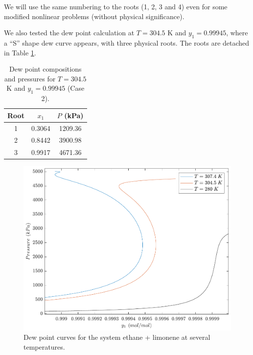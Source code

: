 \documentclass[journal=iecred,manuscript=article]{achemso}
\theoremstyle{definition}
\theoremstyle{remark}
\begin{document}
We will use the same numbering to the roots (1, 2, 3 and 4) even for some modified nonlinear problems (without physical significance).

We also tested the dew point calculation at $T = 304.5$ K and $y_1 = 0.99945$, where a ``S'' shape dew curve appears, with three physical roots. The roots are detached in Table \ref{tab:roots_S}.

\begin{table}[http!]
	\begin{center}
	\begin{tabular}{ccc} \hline \small
Root & $x_1$ & $P$ (kPa) \\
\hline
1 & 0.3064 & 1209.36 \\
2 & 0.8442 & 3900.98 \\
3 & 0.9917 & 4671.36 \\
	\hline
	\end{tabular}
	\caption{ {\small Dew point compositions and pressures for $T = 304.5$ K and $y_1 = 0.99945$ (Case 2).}}\label{tab:roots_S}
	\end{center}
\end{table}

\begin{figure}
	\begin{center}
		\includegraphics[scale=0.50]{curvas_ponto_orvalho.pdf}
		\caption{Dew point curves for the system ethane + limonene at several temperatures.}\label{fig:dew_point_curve}
	\end{center}
\end{figure}
\end{document}
